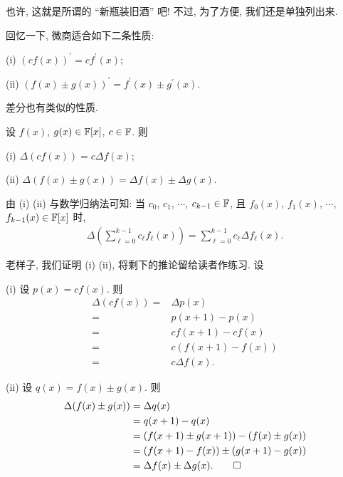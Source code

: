 \begin{pf}
    也许, 这就是所谓的 ``新瓶装旧酒'' 吧! 不过, 为了方便, 我们还是单独列出来.
\end{pf}

回忆一下, 微商适合如下二条性质:

(i) $(cf(x))^{\prime} = c f^{\prime} (x)$;

(ii) $(f(x) \pm g(x))^{\prime} = f^{\prime} (x) \pm g^{\prime} (x)$.

差分也有类似的性质.

\begin{proposition}
    设 $f(x)$, $g(x) \in \mathbb{F}[x]$, $c \in \mathbb{F}$. 则

    (i) $\Delta (cf(x)) = c \Delta f(x)$;

    (ii) $\Delta (f(x) \pm g(x)) = \Delta f(x) \pm \Delta g(x)$.

    由 (i) (ii) 与数学归纳法可知: 当 $c_0$, $c_1$, $\cdots$, $c_{k-1} \in \mathbb{F}$, 且 $f_0 (x)$, $f_1 (x)$, $\cdots$, $f_{k-1} (x) \in \mathbb{F}[x]$ 时,
    \begin{align*}
        \Delta \left( \sum_{\ell = 0}^{k-1} c_\ell f_\ell (x) \right)
        = \sum_{\ell = 0}^{k-1} c_\ell \Delta f_\ell (x).
    \end{align*}
\end{proposition}

\begin{pf}
    老样子, 我们证明 (i) (ii), 将剩下的推论留给读者作练习. 设

    (i) 设 $p(x) = cf(x)$. 则
    \begin{align*}
        \Delta (cf(x))
        = {} & \Delta p(x)      \\
        = {} & p(x+1) - p(x)    \\
        = {} & cf(x+1) - cf(x)  \\
        = {} & c(f(x+1) - f(x)) \\
        = {} & c \Delta f(x).
    \end{align*}

    (ii) 设 $q(x) = f(x) \pm g(x)$. 则
    \begin{align*}
        \Delta (f(x) \pm g(x))
        = {} & \Delta q(x)                           \\
        = {} & q(x+1) - q(x)                         \\
        = {} & (f(x+1) \pm g(x+1)) - (f(x) \pm g(x)) \\
        = {} & (f(x+1) - f(x)) \pm (g(x+1) - g(x))   \\
        = {} & \Delta f(x) \pm \Delta g(x). \qedhere
    \end{align*}
\end{pf}

